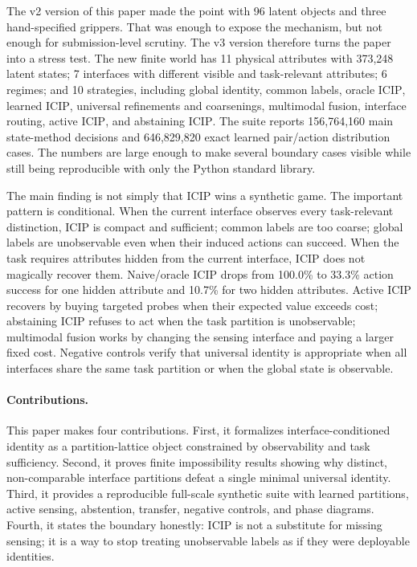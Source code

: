 \documentclass{article}
\newcommand{\icip}{\textsc{ICIP}}
\begin{document}
The v2 version of this paper made the point with 96 latent objects and three hand-specified grippers.
That was enough to expose the mechanism, but not enough for submission-level scrutiny.
The v3 version therefore turns the paper into a stress test.
The new finite world has 11 physical attributes with 373,248 latent states; 7 interfaces with different visible and task-relevant attributes; 6 regimes; and 10 strategies, including global identity, common labels, oracle \icip, learned \icip, universal refinements and coarsenings, multimodal fusion, interface routing, active \icip, and abstaining \icip.
The suite reports 156,764,160 main state-method decisions and 646,829,820 exact learned pair/action distribution cases.
The numbers are large enough to make several boundary cases visible while still being reproducible with only the Python standard library.

The main finding is not simply that \icip{} wins a synthetic game.
The important pattern is conditional.
When the current interface observes every task-relevant distinction, \icip{} is compact and sufficient; common labels are too coarse; global labels are unobservable even when their induced actions can succeed.
When the task requires attributes hidden from the current interface, \icip{} does not magically recover them.
Naive/oracle \icip{} drops from 100.0\% to 33.3\% action success for one hidden attribute and 10.7\% for two hidden attributes.
Active \icip{} recovers by buying targeted probes when their expected value exceeds cost; abstaining \icip{} refuses to act when the task partition is unobservable; multimodal fusion works by changing the sensing interface and paying a larger fixed cost.
Negative controls verify that universal identity is appropriate when all interfaces share the same task partition or when the global state is observable.

\paragraph{Contributions.}
This paper makes four contributions.
First, it formalizes interface-conditioned identity as a partition-lattice object constrained by observability and task sufficiency.
Second, it proves finite impossibility results showing why distinct, non-comparable interface partitions defeat a single minimal universal identity.
Third, it provides a reproducible full-scale synthetic suite with learned partitions, active sensing, abstention, transfer, negative controls, and phase diagrams.
Fourth, it states the boundary honestly: \icip{} is not a substitute for missing sensing; it is a way to stop treating unobservable labels as if they were deployable identities.
\end{document}
